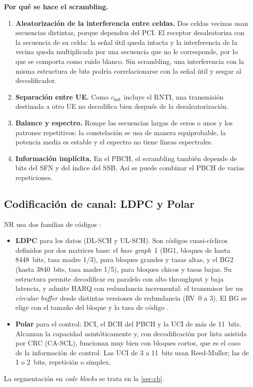 \textbf{Por qué se hace el scrambling.}
\begin{enumerate}
  \item \textbf{Aleatorización de la interferencia entre celdas.} Dos celdas vecinas usan secuencias distintas, porque dependen del PCI. El receptor desaleatoriza con la secuencia de su celda: la señal útil queda intacta y la interferencia de la vecina queda multiplicada por una secuencia que no le corresponde, por lo que se comporta como ruido blanco. Sin scrambling, una interferencia con la misma estructura de bits podría correlacionarse con la señal útil y sesgar al decodificador.
  \item \textbf{Separación entre UE.} Como $c_\text{init}$ incluye el RNTI, una transmisión destinada a otro UE no decodifica bien después de la desaleatorización.
  \item \textbf{Balance y espectro.} Rompe las secuencias largas de ceros o unos y los patrones repetitivos: la constelación se usa de manera equiprobable, la potencia media es estable y el espectro no tiene líneas espectrales.
  \item \textbf{Información implícita.} En el PBCH, el scrambling también depende de bits del SFN y del índice del SSB. Así se puede combinar el PBCH de varias repeticiones.
\end{enumerate}

\subsection{Codificación de canal: LDPC y Polar}\label{sec:codificacion}
NR usa dos familias de códigos \cite{ts38212}:
\begin{itemize}
  \item \textbf{LDPC} para los datos (DL-SCH y UL-SCH). Son códigos cuasi-cíclicos definidos por dos matrices base: el \emph{base graph}~1 (BG1, bloques de hasta 8448~bits, tasa madre 1/3), para bloques grandes y tasas altas, y el BG2 (hasta 3840~bits, tasa madre 1/5), para bloques chicos y tasas bajas. Su estructura permite decodificar en paralelo con alto throughput y baja latencia, y admite HARQ con redundancia incremental: el transmisor lee un \emph{circular buffer} desde distintas versiones de redundancia (RV~0 a 3). El BG se elige con el tamaño del bloque y la tasa de código \cite[§7.2.2]{ts38212}.
  \item \textbf{Polar} para el control: DCI, el BCH del PBCH y la UCI de más de 11~bits. Alcanzan la capacidad asintóticamente y, con decodificación por lista asistida por CRC (CA-SCL), funcionan muy bien con bloques cortos, que es el caso de la información de control. Las UCI de 3 a 11~bits usan Reed-Muller; las de 1 o 2~bits, repetición o simplex.
\end{itemize}
La segmentación en \emph{code blocks} se trata en la \cref{sec:cb}.

